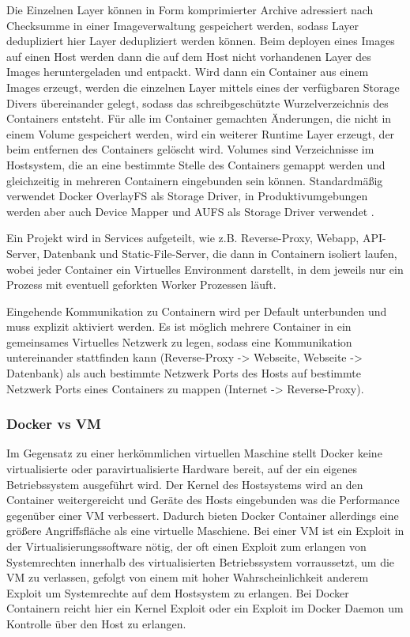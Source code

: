 Die Einzelnen Layer können in Form komprimierter Archive adressiert nach
Checksumme in einer Imageverwaltung gespeichert werden, sodass Layer
dedupliziert hier Layer dedupliziert werden können. Beim deployen eines Images
auf einen Host werden dann die auf dem Host nicht vorhandenen Layer des Images
heruntergeladen und entpackt. Wird dann ein Container aus einem Images erzeugt,
werden die einzelnen Layer mittels eines der verfügbaren Storage Divers
übereinander gelegt, sodass das schreibgeschützte Wurzelverzeichnis des
Containers entsteht. Für alle im Container gemachten Änderungen, die nicht in
einem Volume gespeichert werden, wird ein weiterer Runtime Layer erzeugt, der
beim entfernen des Containers gelöscht wird. Volumes sind Verzeichnisse im
Hostsystem, die an eine bestimmte Stelle des Containers gemappt werden und
gleichzeitig in mehreren Containern eingebunden sein können. Standardmäßig
verwendet Docker OverlayFS als Storage Driver, in Produktivumgebungen werden
aber auch Device Mapper und AUFS als Storage Driver verwendet \cite{docker-stroage-driver}.

Ein Projekt wird in Services aufgeteilt, wie z.B. Reverse-Proxy, Webapp,
API-Server, Datenbank und Static-File-Server, die dann in Containern isoliert
laufen, wobei jeder Container ein Virtuelles Environment darstellt, in dem 
jeweils nur ein Prozess mit eventuell geforkten Worker Prozessen läuft.

Eingehende Kommunikation zu Containern wird per Default unterbunden und muss
explizit aktiviert werden. Es ist möglich mehrere Container in ein
gemeinsames Virtuelles Netzwerk zu legen, sodass eine Kommunikation
untereinander stattfinden kann (Reverse-Proxy -> Webseite, Webseite ->
Datenbank) als auch bestimmte Netzwerk Ports des Hosts auf bestimmte Netzwerk
Ports eines Containers zu mappen (Internet -> Reverse-Proxy).


\subsubsection{Docker vs VM}

Im Gegensatz zu einer herkömmlichen virtuellen Maschine stellt Docker keine
virtualisierte oder paravirtualisierte Hardware bereit, auf der ein eigenes
Betriebssystem ausgeführt wird. Der Kernel des Hostsystems wird an den Container
weitergereicht und Geräte des Hosts eingebunden was die Performance gegenüber
einer VM verbessert. Dadurch bieten Docker Container allerdings eine größere
Angriffsfläche als eine virtuelle Maschiene. Bei einer VM ist ein Exploit in der
Virtualisierungssoftware nötig, der oft einen Exploit zum erlangen von
Systemrechten innerhalb des virtualisierten Betriebssystem vorraussetzt, um die
VM zu verlassen, gefolgt von einem mit hoher Wahrscheinlichkeit anderem Exploit
um Systemrechte auf dem Hostsystem zu erlangen. Bei Docker Containern reicht
hier ein Kernel Exploit oder ein Exploit im Docker Daemon um Kontrolle über den
Host zu erlangen.

